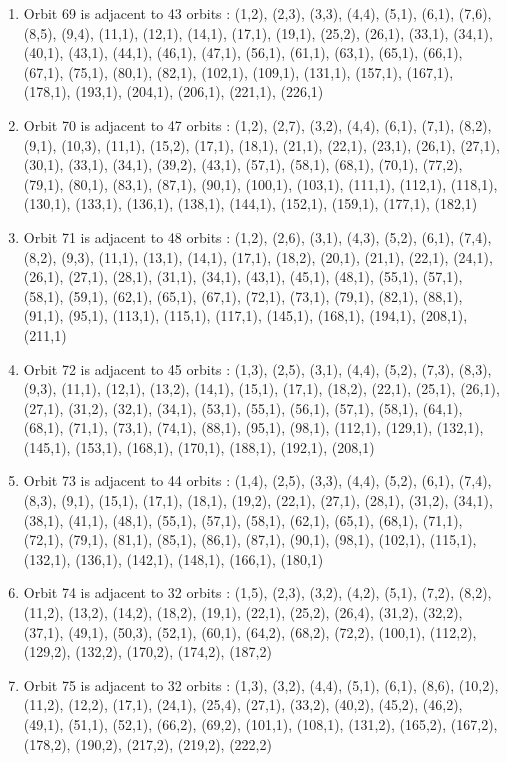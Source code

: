 \documentclass[12pt]{article}
\begin{document}
\begin{enumerate}
\item Orbit 69 is adjacent to 43 orbits : (1,2), (2,3), (3,3), (4,4), (5,1), (6,1), (7,6), (8,5), (9,4), (11,1), (12,1), (14,1), (17,1), (19,1), (25,2), (26,1), (33,1), (34,1), (40,1), (43,1), (44,1), (46,1), (47,1), (56,1), (61,1), (63,1), (65,1), (66,1), (67,1), (75,1), (80,1), (82,1), (102,1), (109,1), (131,1), (157,1), (167,1), (178,1), (193,1), (204,1), (206,1), (221,1), (226,1)
\item Orbit 70 is adjacent to 47 orbits : (1,2), (2,7), (3,2), (4,4), (6,1), (7,1), (8,2), (9,1), (10,3), (11,1), (15,2), (17,1), (18,1), (21,1), (22,1), (23,1), (26,1), (27,1), (30,1), (33,1), (34,1), (39,2), (43,1), (57,1), (58,1), (68,1), (70,1), (77,2), (79,1), (80,1), (83,1), (87,1), (90,1), (100,1), (103,1), (111,1), (112,1), (118,1), (130,1), (133,1), (136,1), (138,1), (144,1), (152,1), (159,1), (177,1), (182,1)
\item Orbit 71 is adjacent to 48 orbits : (1,2), (2,6), (3,1), (4,3), (5,2), (6,1), (7,4), (8,2), (9,3), (11,1), (13,1), (14,1), (17,1), (18,2), (20,1), (21,1), (22,1), (24,1), (26,1), (27,1), (28,1), (31,1), (34,1), (43,1), (45,1), (48,1), (55,1), (57,1), (58,1), (59,1), (62,1), (65,1), (67,1), (72,1), (73,1), (79,1), (82,1), (88,1), (91,1), (95,1), (113,1), (115,1), (117,1), (145,1), (168,1), (194,1), (208,1), (211,1)
\item Orbit 72 is adjacent to 45 orbits : (1,3), (2,5), (3,1), (4,4), (5,2), (7,3), (8,3), (9,3), (11,1), (12,1), (13,2), (14,1), (15,1), (17,1), (18,2), (22,1), (25,1), (26,1), (27,1), (31,2), (32,1), (34,1), (53,1), (55,1), (56,1), (57,1), (58,1), (64,1), (68,1), (71,1), (73,1), (74,1), (88,1), (95,1), (98,1), (112,1), (129,1), (132,1), (145,1), (153,1), (168,1), (170,1), (188,1), (192,1), (208,1)
\item Orbit 73 is adjacent to 44 orbits : (1,4), (2,5), (3,3), (4,4), (5,2), (6,1), (7,4), (8,3), (9,1), (15,1), (17,1), (18,1), (19,2), (22,1), (27,1), (28,1), (31,2), (34,1), (38,1), (41,1), (48,1), (55,1), (57,1), (58,1), (62,1), (65,1), (68,1), (71,1), (72,1), (79,1), (81,1), (85,1), (86,1), (87,1), (90,1), (98,1), (102,1), (115,1), (132,1), (136,1), (142,1), (148,1), (166,1), (180,1)
\item Orbit 74 is adjacent to 32 orbits : (1,5), (2,3), (3,2), (4,2), (5,1), (7,2), (8,2), (11,2), (13,2), (14,2), (18,2), (19,1), (22,1), (25,2), (26,4), (31,2), (32,2), (37,1), (49,1), (50,3), (52,1), (60,1), (64,2), (68,2), (72,2), (100,1), (112,2), (129,2), (132,2), (170,2), (174,2), (187,2)
\item Orbit 75 is adjacent to 32 orbits : (1,3), (3,2), (4,4), (5,1), (6,1), (8,6), (10,2), (11,2), (12,2), (17,1), (24,1), (25,4), (27,1), (33,2), (40,2), (45,2), (46,2), (49,1), (51,1), (52,1), (66,2), (69,2), (101,1), (108,1), (131,2), (165,2), (167,2), (178,2), (190,2), (217,2), (219,2), (222,2)

\end{enumerate}
\end{document}
